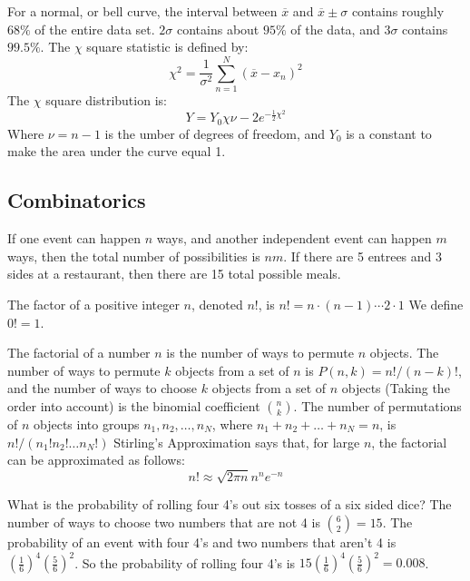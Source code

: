 \documentclass[crop=false,class=article,oneside]{standalone}
\begin{document}
        For a normal, or bell curve, the interval between
        $\overline{x}$ and $\overline{x}\pm\sigma$ contains
        roughly $68\%$ of the entire data set. $2\sigma$
        contains about $95\%$ of the data, and
        $3\sigma$ contains $99.5\%$.
        The $\chi$ square statistic is defined by:
        \begin{equation*}
            \chi^{2}=\frac{1}{\sigma^{2}}
                \sum_{n=1}^{N}(\overline{x}-x_{n})^{2}
        \end{equation*}
        The $\chi$ square distribution is:
        \begin{equation*}
            Y=Y_{0}\chi{\nu-2}e^{-\frac{1}{2}\chi^{2}}
        \end{equation*}
        Where $\nu=n-1$ is the umber of degrees of freedom,
        and $Y_{0}$ is a constant to make the area under the
        curve equal 1.
    \subsection{Combinatorics}
        If one event can happen $n$ ways, and another independent
        event can happen $m$ ways, then the total number
        of possibilities is $nm$. If there are 5 entrees
        and 3 sides at a restaurant, then there are
        15 total possible meals.
        \begin{definition}
            The factor of a positive integer
            $n$, denoted $n!$, is
            $n!=n\cdot(n-1)\cdots{2}\cdot{1}$
            We define $0!=1$.
        \end{definition}
        The factorial of a number $n$ is the number
        of ways to permute $n$ objects. The number of ways
        to permute $k$ objects from a set of $n$ is
        $P(n,k)=n!/(n-k)!$, and the number of ways to
        choose $k$ objects from a set of $n$ objects
        (Taking the order into account) is the
        binomial coefficient $\binom{n}{k}$. The number
        of permutations of $n$ objects into groups
        $n_{1},n_{2},\hdots,n_{N}$, where
        $n_{1}+n_{2}+\hdots+n_{N}=n$, is
        $n!/(n_{1}!n_{2}!\hdots{n_{N}!})$
        Stirling's Approximation says that, for large
        $n$, the factorial can be approximated as follows:
        \begin{equation*}
            n!\approx\sqrt{2\pi{n}}n^{n}e^{-n}
        \end{equation*}
        \begin{example}
            What is the probability of rolling
            four 4's out six tosses of a six sided
            dice? The number of ways to choose
            two numbers that are not 4 is
            $\binom{6}{2}=15$. The probability of
            an event with four 4's and two numbers
            that aren't 4 is
            $(\frac{1}{6})^{4}(\frac{5}{6})^{2}$.
            So the probability of rolling four 4's is
            $15(\frac{1}{6})^{4}(\frac{5}{6})^{2}=0.008$.
        \end{example}
\end{document}
